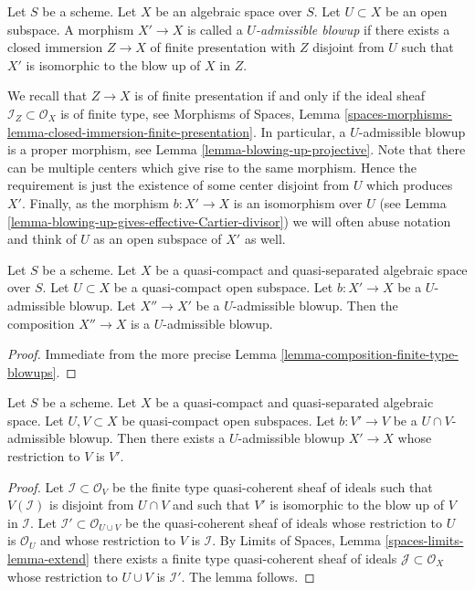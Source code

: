 \begin{definition}
\label{definition-admissible-blowup}
Let $S$ be a scheme. Let $X$ be an algebraic space over $S$.
Let $U \subset X$ be an open subspace. A morphism
$X' \to X$ is called a {\it $U$-admissible blowup} if there exists a
closed immersion $Z \to X$ of finite presentation with $Z$ disjoint from
$U$ such that $X'$ is isomorphic to the blow up of $X$ in $Z$.
\end{definition}

\noindent
We recall that $Z \to X$ is of finite presentation if and only if the
ideal sheaf $\mathcal{I}_Z \subset \mathcal{O}_X$ is of finite type, see
Morphisms of Spaces, Lemma
\ref{spaces-morphisms-lemma-closed-immersion-finite-presentation}.
In particular, a $U$-admissible blowup is a proper morphism, see
Lemma \ref{lemma-blowing-up-projective}.
Note that there can be multiple centers which give rise to the same morphism.
Hence the requirement is just the existence of some center disjoint from
$U$ which produces $X'$.
Finally, as the morphism $b : X' \to X$ is an isomorphism over $U$ (see
Lemma \ref{lemma-blowing-up-gives-effective-Cartier-divisor}) we will often
abuse notation and think of $U$ as an open subspace of $X'$ as well.

\begin{lemma}
\label{lemma-composition-admissible-blowups}
Let $S$ be a scheme.
Let $X$ be a quasi-compact and quasi-separated algebraic space over $S$.
Let $U \subset X$ be a quasi-compact open subspace.
Let $b : X' \to X$ be a $U$-admissible blowup.
Let $X'' \to X'$ be a $U$-admissible blowup.
Then the composition $X'' \to X$ is a $U$-admissible blowup.
\end{lemma}

\begin{proof}
Immediate from the more precise
Lemma \ref{lemma-composition-finite-type-blowups}.
\end{proof}

\begin{lemma}
\label{lemma-extend-admissible-blowups}
Let $S$ be a scheme.
Let $X$ be a quasi-compact and quasi-separated algebraic space.
Let $U, V \subset X$ be quasi-compact open subspaces.
Let $b : V' \to V$ be a $U \cap V$-admissible blowup.
Then there exists a $U$-admissible blowup $X' \to X$
whose restriction to $V$ is $V'$.
\end{lemma}

\begin{proof}
Let $\mathcal{I} \subset \mathcal{O}_V$ be the finite type
quasi-coherent sheaf of ideals such that $V(\mathcal{I})$ is
disjoint from $U \cap V$ and such that $V'$ is isomorphic to the
blow up of $V$ in $\mathcal{I}$. Let
$\mathcal{I}' \subset \mathcal{O}_{U \cup V}$ be the quasi-coherent
sheaf of ideals whose restriction to $U$ is $\mathcal{O}_U$ and
whose restriction to $V$ is $\mathcal{I}$.
By Limits of Spaces, Lemma \ref{spaces-limits-lemma-extend}
there exists a finite type quasi-coherent sheaf of ideals
$\mathcal{J} \subset \mathcal{O}_X$ whose restriction to $U \cup V$ is
$\mathcal{I}'$. The lemma follows.
\end{proof}

